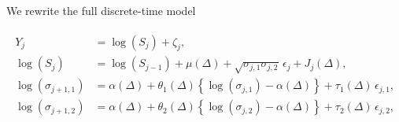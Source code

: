\label{ap:mcmc}

We rewrite the full discrete-time model

\begin{align}
  \label{eq:mod2-appendix}
  \begin{split}
  Y_j &= \log(S_j) + \zeta_j  ,    \\
  \log(S_{j}) &= \log(S_{j-1}) + \mu(\Delta) + \sqrt{\sigma_{j,1}\sigma_{j,2}} \, \epsilon_{j} + J_j(\Delta)   ,   \\
  \log(\sigma_{j+1,1}) &= \alpha(\Delta) + \theta_1(\Delta) \left\{ \log(\sigma_{j,1}) - \alpha(\Delta) \right\} + \tau_1(\Delta) \, \epsilon_{j,1}    ,   \\
  \log(\sigma_{j+1,2}) &= \alpha(\Delta) + \theta_2(\Delta) \left\{ \log(\sigma_{j,2}) - \alpha(\Delta) \right\} + \tau_2(\Delta) \, \epsilon_{j,2}    ,
  \end{split}
\end{align}

